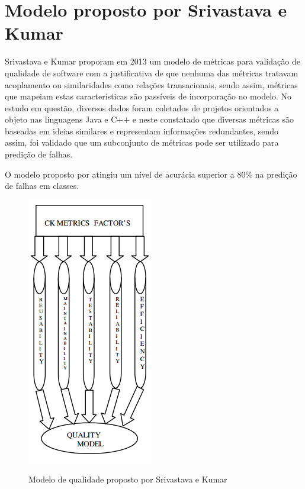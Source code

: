 \documentclass[
	12pt,				%
	oneside,			%
	a4paper,			%
	english,			%
	brazil				%
	]{abntex2ppgsi}
\begin{document}
\section{Modelo proposto por Srivastava e Kumar}

Srivastava e Kumar proporam em 2013 um modelo de métricas para validação de qualidade de software com a justificativa de que nenhuma das métricas tratavam acoplamento ou similaridades como relações transacionais, sendo assim, métricas que mapeiam estas características são passíveis de incorporação no modelo. No estudo em questão, diversos dados foram coletados de projetos orientados a objeto nas linguagens Java e C++ e neste constatado que diversas métricas são baseadas em ideias similares e representam informações redundantes, sendo assim, foi validado que um subconjunto de métricas pode ser utilizado para predição de falhas.

O modelo proposto por \cite{srivastava2013} atingiu um nível de acurácia superior a 80\% na predição de falhas em classes.

\begin{figure}[H]%
	\centering
 	  \caption{Modelo de qualidade proposto por Srivastava e Kumar}
		\includegraphics{modelo_srivastava_kumar.png}
	\label{fig:tipos-custo-arvore}
\end{figure}
\end{document}
